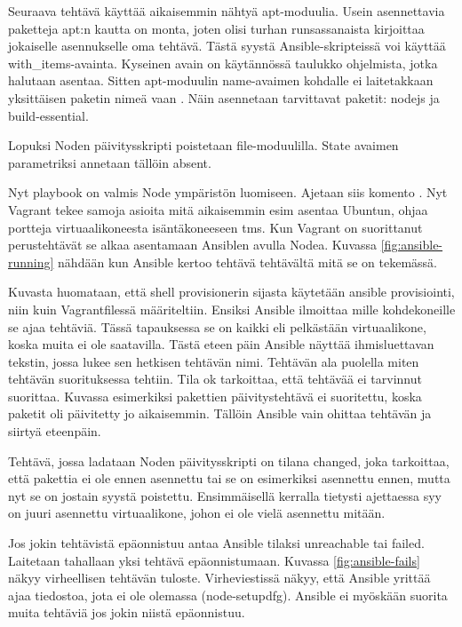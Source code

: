 Seuraava tehtävä käyttää aikaisemmin nähtyä apt-moduulia. Usein asennettavia paketteja apt:n kautta on monta, joten olisi turhan runsassanaista kirjoittaa jokaiselle asennukselle oma tehtävä. Tästä syystä Ansible-skripteissä voi käyttää with\_items-avainta. Kyseinen avain on käytännössä taulukko ohjelmista, jotka halutaan asentaa. Sitten apt-moduulin name-avaimen kohdalle ei laitetakkaan yksittäisen paketin nimeä vaan . Näin asennetaan tarvittavat paketit: nodejs ja build-essential.

Lopuksi Noden päivitysskripti poistetaan file-moduulilla. State avaimen parametriksi annetaan tällöin absent.

Nyt playbook on valmis Node ympäristön luomiseen. Ajetaan siis komento . Nyt Vagrant tekee samoja asioita mitä aikaisemmin esim asentaa Ubuntun, ohjaa portteja virtuaalikoneesta isäntäkoneeseen tms. Kun Vagrant on suorittanut perustehtävät se alkaa asentamaan Ansiblen avulla Nodea. Kuvassa \ref{fig:ansible-running} nähdään kun Ansible kertoo tehtävä tehtävältä mitä se on tekemässä.

Kuvasta huomataan, että shell provisionerin sijasta käytetään ansible provisiointi, niin kuin Vagrantfilessä määriteltiin. Ensiksi Ansible ilmoittaa mille kohdekoneille se ajaa tehtäviä. Tässä tapauksessa se on kaikki eli pelkästään virtuaalikone, koska muita ei ole saatavilla. Tästä eteen päin Ansible näyttää ihmisluettavan tekstin, jossa lukee sen hetkisen tehtävän nimi. Tehtävän ala puolella miten tehtävän suorituksessa tehtiin. Tila ok tarkoittaa, että tehtävää ei tarvinnut suorittaa. Kuvassa esimerkiksi pakettien päivitystehtävä ei suoritettu, koska paketit oli päivitetty jo aikaisemmin. Tällöin Ansible vain ohittaa tehtävän ja siirtyä eteenpäin.

Tehtävä, jossa ladataan Noden päivitysskripti on tilana changed, joka tarkoittaa, että pakettia ei ole ennen asennettu tai se on esimerkiksi asennettu ennen, mutta nyt se on jostain syystä poistettu. Ensimmäisellä kerralla tietysti ajettaessa syy on juuri asennettu virtuaalikone, johon ei ole vielä asennettu mitään.

Jos jokin tehtävistä epäonnistuu antaa Ansible tilaksi unreachable tai failed. Laitetaan tahallaan yksi tehtävä epäonnistumaan. Kuvassa \ref{fig:ansible-fails} näkyy virheellisen tehtävän tuloste. Virheviestissä näkyy, että Ansible yrittää ajaa tiedostoa, jota ei ole olemassa (node-setupdfg). Ansible ei myöskään suorita muita tehtäviä jos jokin niistä epäonnistuu.

